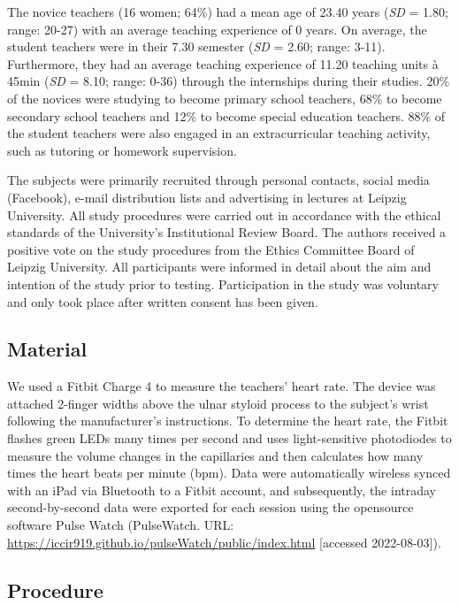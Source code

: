 \documentclass[
  man]{apa6}
\begin{document}
The novice teachers (16 women; 64\%) had a mean age of 23.40 years (\emph{SD} = 1.80; range: 20-27) with an average teaching experience of 0 years. On average, the student teachers were in their 7.30 semester (\emph{SD} = 2.60; range: 3-11). Furthermore, they had an average teaching experience of 11.20 teaching units à 45min (\emph{SD} = 8.10; range: 0-36) through the internships during their studies.
20\% of the novices were studying to become primary school teachers, 68\% to become secondary school teachers and 12\% to become special education teachers. 88\% of the student teachers were also engaged in an extracurricular teaching activity, such as tutoring or homework supervision.

The subjects were primarily recruited through personal contacts, social media (Facebook), e-mail distribution lists and advertising in lectures at Leipzig University. All study procedures were carried out in accordance with the ethical standards of the University's Institutional Review Board. The authors received a positive vote on the study procedures from the Ethics Committee Board of Leipzig University. All participants were informed in detail about the aim and intention of the study prior to testing. Participation in the study was voluntary and only took place after written consent has been given.

\hypertarget{material}{%
\subsection{Material}\label{material}}

We used a Fitbit Charge 4 to measure the teachers' heart rate. The device was attached 2-finger widths above the ulnar styloid process to the subject's wrist following the manufacturer's instructions. To determine the heart rate, the Fitbit flashes green LEDs many times per second and uses light-sensitive photodiodes to measure the volume changes in the capillaries and then calculates how many times the heart beats per minute (bpm). Data were automatically wireless synced with an iPad via Bluetooth to a Fitbit account, and subsequently, the intraday second-by-second data were exported for each session using the opensource software Pulse Watch (PulseWatch. URL: \url{https://iccir919.github.io/pulseWatch/public/index.html} {[}accessed 2022-08-03{]}).

\hypertarget{procedure}{%
\subsection{Procedure}\label{procedure}}
\end{document}
